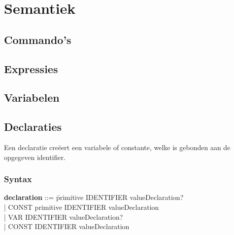 \chapter{Semantiek}

\section{Commando's}

\section{Expressies}

\section{Variabelen}

\section{Declaraties}
Een declaratie cre\"{e}ert een variabele of constante, welke is gebonden aan de opgegeven identifier.
    \subsection{Syntax}    
        \begin{tabbing}
        {\bf declaration}                 ::= \=primitive IDENTIFIER valueDeclaration?\\
                                              \>| CONST primitive IDENTIFIER valueDeclaration\\
                                              \>| VAR IDENTIFIER valueDeclaration?\\
                                              \>| CONST IDENTIFIER valueDeclaration\\
        \end{tabbing}
